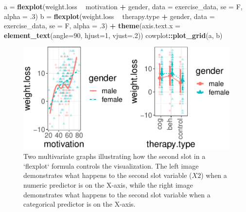 \documentclass[
  doc]{apa6}
\newenvironment{Shaded}{\begin{snugshade}}{\end{snugshade}}
\newcommand{\DataTypeTok}[1]{\textcolor[rgb]{0.13,0.29,0.53}{#1}}
\newcommand{\DecValTok}[1]{\textcolor[rgb]{0.00,0.00,0.81}{#1}}
\newcommand{\FloatTok}[1]{\textcolor[rgb]{0.00,0.00,0.81}{#1}}
\newcommand{\KeywordTok}[1]{\textcolor[rgb]{0.13,0.29,0.53}{\textbf{#1}}}
\newcommand{\NormalTok}[1]{#1}
\newcommand{\OperatorTok}[1]{\textcolor[rgb]{0.81,0.36,0.00}{\textbf{#1}}}
\newcommand{\StringTok}[1]{\textcolor[rgb]{0.31,0.60,0.02}{#1}}
\begin{document}
\begin{Shaded}
\begin{Highlighting}[]
\NormalTok{a =}\StringTok{ }\KeywordTok{flexplot}\NormalTok{(weight.loss }\OperatorTok{~}\StringTok{ }\NormalTok{motivation }\OperatorTok{+}\StringTok{ }\NormalTok{gender, }
    \DataTypeTok{data =}\NormalTok{ exercise_data, }\DataTypeTok{se =}\NormalTok{ F, }\DataTypeTok{alpha =} \FloatTok{.3}\NormalTok{)}
\NormalTok{b =}\StringTok{ }\KeywordTok{flexplot}\NormalTok{(weight.loss }\OperatorTok{~}\StringTok{ }\NormalTok{therapy.type }\OperatorTok{+}\StringTok{ }\NormalTok{gender, }
    \DataTypeTok{data =}\NormalTok{ exercise_data, }\DataTypeTok{se =}\NormalTok{ F, }\DataTypeTok{alpha =} \FloatTok{.3}\NormalTok{) }\OperatorTok{+}
\StringTok{    }\KeywordTok{theme}\NormalTok{(}\DataTypeTok{axis.text.x =} \KeywordTok{element_text}\NormalTok{(}\DataTypeTok{angle=}\DecValTok{90}\NormalTok{, }\DataTypeTok{hjust=}\DecValTok{1}\NormalTok{, }\DataTypeTok{vjust=}\NormalTok{.}\DecValTok{2}\NormalTok{))}
\NormalTok{cowplot}\OperatorTok{::}\KeywordTok{plot_grid}\NormalTok{(a, b)}
\end{Highlighting}
\end{Shaded}

\begin{figure}

{\centering \includegraphics[width=1\linewidth]{flexplot_psychmeth_files/figure-latex/symbols-1} 

}

\caption{Two multivariate graphs illustrating how the second slot in a `flexplot` formula controls the visualization. The left image demonstrates what happens to the second slot variable ($X2$) when a numeric predictor is on the X-axis, while the right image demonstrates what happens to the second slot variable when a categorical predictor is on the X-axis.\label{fig:symbols}}\label{fig:symbols}
\end{figure}
\end{document}
